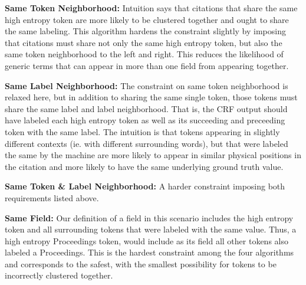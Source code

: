 \textbf{Same Token Neighborhood:} Intuition says that citations that share the same high entropy token are more likely to be clustered together and ought to share the same labeling.  This algorithm hardens the constraint slightly by imposing that citations must share not only the same high entropy token, but also the same token neighborhood to the left and right.  This reduces the likelihood of generic terms that can appear in more than one field from appearing together. 

\textbf{Same Label Neighborhood:} The constraint on same token neighborhood is relaxed here, but in addition to sharing the same single token, those tokens must share the same label and label neighborhood.  That is, the CRF output should have labeled each high entropy token as well as its succeeding and preceeding token with the same label.  The intuition is that tokens appearing in slightly different contexts (ie. with different surrounding words), but that were labeled the same by the machine are more likely to appear in similar physical positions in the citation and more likely to have the same underlying ground truth value.

\textbf{Same Token \& Label Neighborhood:} A harder constraint imposing both requirements listed above.

\textbf{Same Field:} Our definition of a field in this scenario includes the high entropy token and all surrounding tokens that were labeled with the same value.  Thus, a high entropy Proceedings token, would include as its field all other tokens also labeled a Proceedings.  This is the hardest constraint among the four algorithms and corresponds to the safest, with the smallest possibility for tokens to be incorrectly clustered together. 


